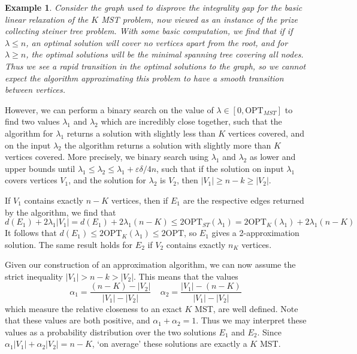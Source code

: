 \documentclass{article}
\theoremstyle{plain}
\newtheorem*{example}{Example}
\theoremstyle{plain}
\begin{document}
\begin{example}
    Consider the graph used to disprove the integrality gap for the basic linear relaxation of the $K$ MST problem, now viewed as an instance of the prize collecting steiner tree problem. With some basic computation, we find that if if $\lambda \leq n$, an optimal solution will cover no vertices apart from the root, and for $\lambda \geq n$, the optimal solutions will be the minimal spanning tree covering all nodes. Thus we see a rapid transition in the optimal solutions to the graph, so we cannot expect the algorithm approximating this problem to have a smooth transition between vertices.
\end{example}

However, we can perform a binary search on the value of $\lambda \in [0,\text{OPT}_{MST}]$ to find two values $\lambda_1$ and $\lambda_2$ which are incredibly close together, such that the algorithm for $\lambda_1$ returns a solution with slightly less than $K$ vertices covered, and on the input $\lambda_2$ the algorithm returns a solution with slightly more than $K$ vertices covered. More precisely, we binary search using $\lambda_1$ and $\lambda_2$ as lower and upper bounds until $\lambda_1 \leq \lambda_2 \leq \lambda_1 + \varepsilon \delta / 4n$, such that if the solution on input $\lambda_1$ covers vertices $V_1$, and the solution for $\lambda_2$ is $V_2$, then $|V_1| \geq n - k \geq |V_2|$.

If $V_1$ contains exactly $n-K$ vertices, then if $E_1$ are the respective edges returned by the algorithm, we find that
%
\[ d(E_1) + 2 \lambda_1 |V_1| = d(E_1) + 2 \lambda_1(n-K) \leq 2\text{OPT}_{ST}(\lambda_1) = 2\text{OPT}_K(\lambda_1) + 2\lambda_1(n-K) \]
%
It follows that $d(E_1) \leq 2 \text{OPT}_K(\lambda_1) \leq 2 \text{OPT}$, so $E_1$ gives a 2-approximation solution. The same result holds for $E_2$ if $V_2$ contains exactly $n_K$ vertices.

Given our construction of an approximation algorithm, we can now assume the strict inequality $|V_1| > n - k > |V_2|$. This means that the values
%
\[ \alpha_1 = \frac{(n-K) - |V_2|}{|V_1| - |V_2|}\ \ \ \ \ \alpha_2 = \frac{|V_1| - (n-K)}{|V_1| - |V_2|} \]
%
which measure the relative closeness to an exact $K$ MST, are well defined. Note that these values are both positive, and $\alpha_1 + \alpha_2 = 1$. Thus we may interpret these values as a probability distribution over the two solutions $E_1$ and $E_2$. Since $\alpha_1 |V_1| + \alpha_2 |V_2| = n-K$, `on average' these solutions are exactly a $K$ MST.
\end{document}
